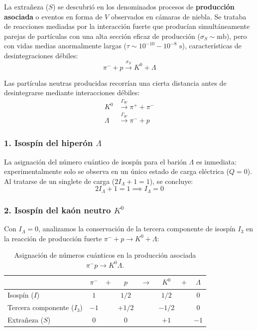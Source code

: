 La extrañeza ($S$) se descubrió en los denominados procesos de \textbf{producción asociada} o eventos en forma de $V$ observados en cámaras de niebla. Se trataba de reacciones mediadas por la interacción fuerte que producían simultáneamente parejas de partículas con una alta sección eficaz de producción ($\sigma_S \sim \text{mb}$), pero con vidas medias anormalmente largas ($\tau \sim 10^{-10} - 10^{-8}\text{ s}$), características de desintegraciones débiles:
\begin{equation}
    \pi^- + p \xrightarrow{\sigma_S} K^0 + \Lambda
\end{equation}

Las partículas neutras producidas recorrían una cierta distancia antes de desintegrarse mediante interacciones débiles:
\begin{align}
    K^0 &\xrightarrow{\Gamma_W} \pi^+ + \pi^- \\
    \Lambda &\xrightarrow{\Gamma_W} \pi^- + p
\end{align}

\subsubsection*{1. Isospín del hiperón $\Lambda$}

La asignación del número cuántico de isospín para el barión $\Lambda$ es inmediata: experimentalmente solo se observa en un único estado de carga eléctrica ($Q = 0$). Al tratarse de un singlete de carga ($2I_\Lambda + 1 = 1$), se concluye:
\begin{equation}
    2I_\Lambda + 1 = 1 \implies I_\Lambda = 0
\end{equation}

\subsubsection*{2. Isospín del kaón neutro $K^0$}

Con $I_\Lambda = 0$, analizamos la conservación de la tercera componente de isospín $I_3$ en la reacción de producción fuerte $\pi^- + p \to K^0 + \Lambda$:

\begin{table}[htbp]
    \centering
    \begin{tabular}{l c c c c c c c}
        \toprule
        & $\pi^-$ & $+$ & $p$ & $\longrightarrow$ & $K^0$ & $+$ & $\Lambda$ \\
        \midrule
        Isospín ($I$) & $1$ & & $1/2$ & & $1/2$ & & $0$ \\
        Tercera componente ($I_3$) & $-1$ & & $+1/2$ & & $-1/2$ & & $0$ \\
        Extrañeza ($S$) & $0$ & & $0$ & & $+1$ & & $-1$ \\
        \bottomrule
    \end{tabular}
    \caption{Asignación de números cuánticos en la producción asociada $\pi^- p \to K^0 \Lambda$.}
    \label{tab:produccion_asociada_k0_lambda}
\end{table}

